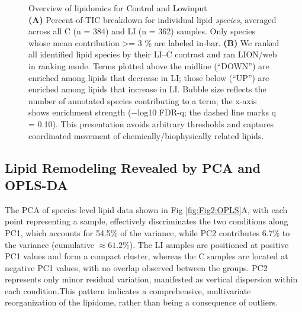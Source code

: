 \documentclass[10pt,letterpaper]{article}
\begin{document}
\begin{itemize}
\begin{figure}[htbp]
    \caption{Overview of lipidomics for Control and Lowinput \\
    \textbf{(A)} Percent‐of‐TIC breakdown for individual lipid \emph{species}, averaged across all C (n = 384) and LI (n = 362) samples. Only species whose mean contribution >= 3 \% are labeled in‐bar.  
    \textbf{(B)} We ranked all identified lipid species by their LI–C contrast and ran LION/web in ranking mode. Terms plotted above the midline (“DOWN”) are enriched among lipids that decrease in LI; those below (“UP”) are enriched among lipids that increase in LI. Bubble size reflects the number of annotated species contributing to a term; the x-axis shows enrichment strength (−log10 FDR-q; the dashed line marks q = 0.10). This presentation avoids arbitrary thresholds and captures coordinated movement of chemically/biophysically related lipids.}
    
  \label{fig:Fig1_lipid_class}
\end{figure}

\subsection*{Lipid Remodeling Revealed by PCA and OPLS-DA}

The PCA of species level lipid data shown in Fig \ref{fig:Fig2:OPLS}A, with each point representing a sample, effectively discriminates the two conditions along PC1, which accounts for 54.5\% of the variance, while PC2 contributes 6.7\% to the variance (cumulative $\approx 61.2\%$). The LI samples are positioned at positive PC1 values and form a compact cluster, whereas the C samples are located at negative PC1 values, with no overlap observed between the groups. PC2 represents only minor residual variation, manifested as vertical dispersion within each condition.This pattern indicates a comprehensive, multivariate reorganization of the lipidome, rather than being a consequence of outliers. 


\end{itemize}
\end{document}
